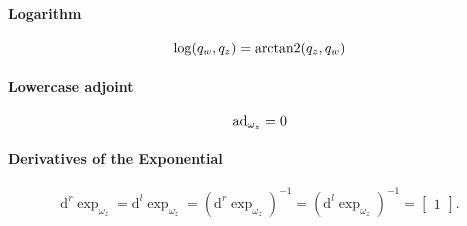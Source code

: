\begin{properties}[breakable, title={$\SOtwo$ parameterized by $\Uone$}]
\paragraph{Logarithm}
\begin{equation}
  \log (q_{w}, q_{z}) = \operatorname{arctan2}(q_z, q_w)
\end{equation}

\paragraph{Lowercase adjoint}
\begin{equation}
  \operatorname{ad}_{\omega_z} = 0
\end{equation}

\paragraph{Derivatives of the Exponential}
\begin{equation}
  \mathrm{d}^r \exp_{\omega_z} =
  \mathrm{d}^l \exp_{\omega_z} =
  \left( \mathrm{d}^r \exp_{\omega_z} \right)^{-1} =
  \left( \mathrm{d}^l \exp_{\omega_z} \right)^{-1} = \begin{bmatrix} 1 \end{bmatrix}.
\end{equation}
\end{properties}

